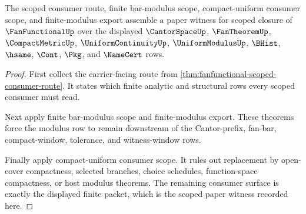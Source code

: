 \begin{theorem}
\label{thm:fanfunctional-scoped-closure-record}
The scoped consumer route, finite bar-modulus scope, compact-uniform consumer scope, and finite-modulus export assemble a paper witness for scoped closure of $\FanFunctionalUp$ over the displayed $\CantorSpaceUp$, $\FanTheoremUp$, $\CompactMetricUp$, $\UniformContinuityUp$, $\UniformModulusUp$, $\BHist$, $\hsame$, $\Cont$, $\Pkg$, and $\NameCert$ rows.
\end{theorem}
\begin{proof}
First collect the carrier-facing route from \autoref{thm:fanfunctional-scoped-consumer-route}. It states which finite analytic and structural rows every scoped consumer must read.

Next apply finite bar-modulus scope and finite-modulus export. These theorems force the modulus row to remain downstream of the Cantor-prefix, fan-bar, compact-window, tolerance, and witness-window rows.

Finally apply compact-uniform consumer scope. It rules out replacement by open-cover compactness, selected branches, choice schedules, function-space compactness, or host modulus theorems. The remaining consumer surface is exactly the displayed finite packet, which is the scoped paper witness recorded here.
\end{proof}
